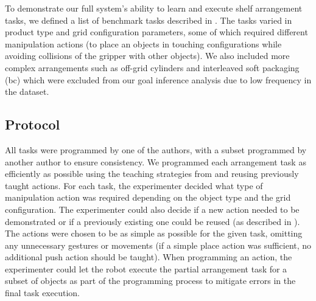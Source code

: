 To demonstrate our full system's ability to learn and execute shelf arrangement tasks, we defined a list of benchmark tasks described in . 
The tasks varied in product type and grid configuration parameters, some of which required different manipulation actions (\eg to place an objects in touching configurations while avoiding collisions of the gripper with other objects).
We also included more complex arrangements such as off-grid cylinders and interleaved soft packaging (bc) which were excluded from our goal inference analysis due to low frequency in the dataset. 

\subsection{Protocol}
All tasks were programmed by one of the authors, with a subset programmed by another author to ensure consistency.
We programmed each arrangement task as efficiently as possible using the teaching strategies from  and reusing previously taught actions. 
For each task, the experimenter decided what type of manipulation action was required depending on the object type and the grid configuration.
The experimenter could also decide if a new action needed to be demonstrated or if a previously existing one could be reused (as described in ).
The actions were chosen to be as simple as possible for the given task, omitting any unnecessary gestures or movements (\eg if a simple place action was sufficient, no additional push action should be taught). When programming an action, the experimenter could let the robot execute the partial arrangement task for a subset of objects as part of the programming process to mitigate errors in the final task execution.


